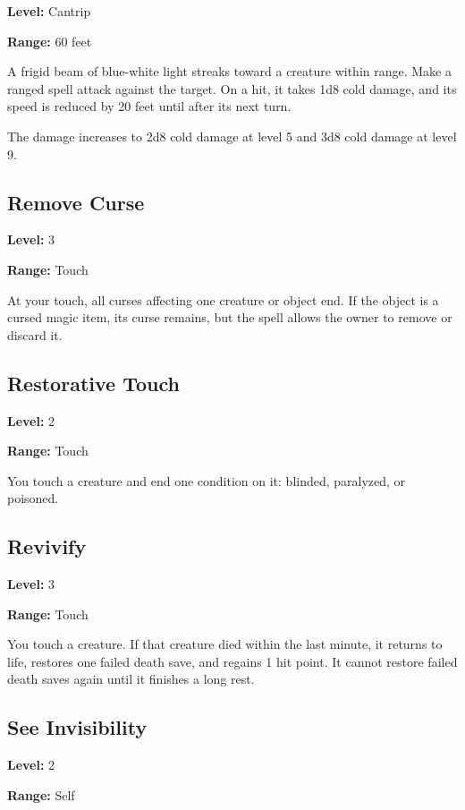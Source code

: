 \documentclass[12pt,letterpaper,twocolumn,openany,nodeprecatedcode,bg=none]{dndbook}
\let\oldsubsection\subsection
\renewcommand{\subsection}[1]{%
  \needspace{5\baselineskip}%
  \oldsubsection{#1}%
}
\begin{document}
\textbf{Level:} Cantrip

\textbf{Range:} 60 feet

A frigid beam of blue-white light streaks toward a creature within
range. Make a ranged spell attack against the target. On a hit, it takes
1d8 cold damage, and its speed is reduced by 20 feet until after its
next turn.

The damage increases to 2d8 cold damage at level 5 and 3d8 cold damage
at level 9.

\subsection{Remove Curse}\label{remove-curse}

\textbf{Level:} 3

\textbf{Range:} Touch

At your touch, all curses affecting one creature or object end. If the
object is a cursed magic item, its curse remains, but the spell allows
the owner to remove or discard it.

\subsection{Restorative Touch}\label{restorative-touch}

\textbf{Level:} 2

\textbf{Range:} Touch

You touch a creature and end one condition on it: blinded, paralyzed, or
poisoned.

\subsection{Revivify}\label{revivify}

\textbf{Level:} 3

\textbf{Range:} Touch

You touch a creature. If that creature died within the last minute, it
returns to life, restores one failed death save, and regains 1 hit
point. It cannot restore failed death saves again until it finishes a
long rest.

\subsection{See Invisibility}\label{see-invisibility}

\textbf{Level:} 2

\textbf{Range:} Self
\end{document}
